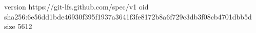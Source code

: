 version https://git-lfs.github.com/spec/v1
oid sha256:6e56dd1bde46930f395f1937a3641f3fe8172b8a6f729c3db3f08cb4701dbb5d
size 5612
